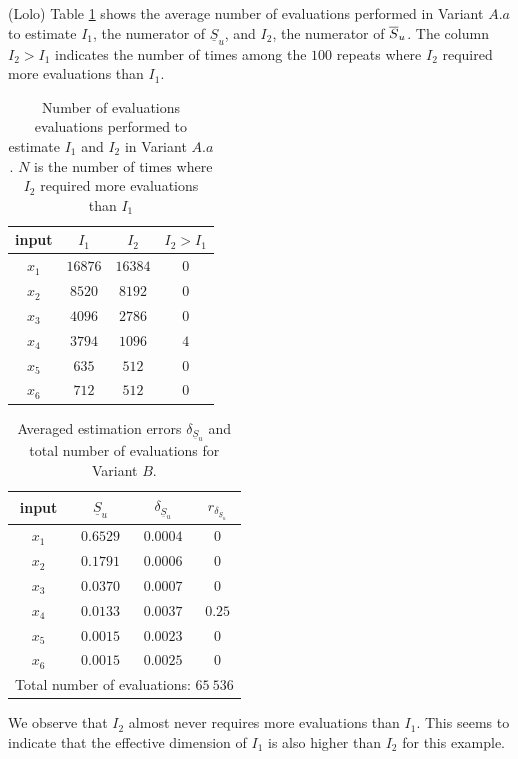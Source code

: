 {\color{purple}(Lolo) Table \ref{comparison.bratley} shows the average number of evaluations performed in Variant $A.a$ to estimate $I_1$, the numerator of $\underline{S}_u$, and $I_2$, the numerator of $\ov{$S$}_u$. The column $I_2 > I_1$ indicates the number of times among the $100$ repeats where $I_2$ required more evaluations than $I_1$. 
\begin{table}[t]
\caption{Number of evaluations evaluations performed to estimate $I_1$ and $I_2$ in Variant $A.a$. $N$ is the number of times where $I_2$ required more evaluations than $I_1$}
\centering
\begin{tabular}{cccc}
\hline
 input & $I_1$ & $I_2$ & $I_2 > I_1$ \\ \hline
 $x_1$ & $16876$ & $16384$ & $0$ \\  \hline
 $x_2$ & $8520$ & $8192$ & $0$ \\  \hline
 $x_3$ & $4096$ & $2786$ & $0$ \\  \hline
 $x_4$ & $3794$ & $1096$ & $4$ \\  \hline
 $x_5$ & $635$ & $512$ & $0$ \\  \hline
 $x_6$ & $712$ & $512$ & $0$ \\ 
\hline 
\end{tabular}
\label{comparison.bratley}
\end{table}
\begin{table}[t]
\caption{Averaged estimation errors $\delta_{\underline{S}_u}$ and total number of evaluations for Variant $B$.}
\centering
\begin{tabular}{cccc}
\hline
 input & $\underline{S}_u$ & $\delta_{\underline{S}_u}$ & $r_{\delta_{\underline{S}_u}}$ \\ \hline
 $x_1$ & $0.6529$ &  $0.0004$ & $0$ \\ \hline
 $x_2$ & $0.1791$ &  $0.0006$ & $0$ \\ \hline
 $x_3$ & $0.0370$ &  $0.0007$ & $0$ \\ \hline
 $x_4$ & $0.0133$ &  $0.0037$ & $0.25$    \\ \hline
 $x_5$ & $0.0015$ & $0.0023$ & $0$  \\ \hline
 $x_6$ & $0.0015$ & $0.0025$ & $0$  \\ \hline \hline
\multicolumn{4}{l}{Total number of evaluations: $65 \ 536$}\\ \hline 
\end{tabular}
\label{res.bratley.B}
\end{table}
We observe that $I_2$ almost never requires more evaluations than $I_1$. This seems to indicate that the effective dimension of $I_1$ is also higher than $I_2$ for this example.}

